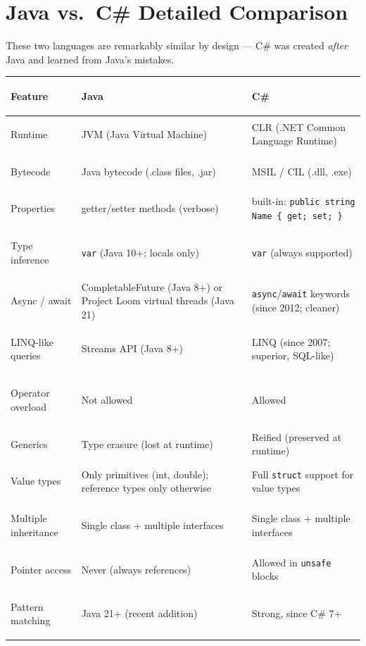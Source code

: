\documentclass[11pt, letterpaper]{article}
\begin{document}
\section*{Java vs.\ C\# Detailed Comparison}

These two languages are remarkably similar by design --- C\# was created \emph{after} Java and learned from Java's mistakes.

\noindent
{\small\renewcommand{\arraystretch}{1.6}
\begin{tabularx}{\textwidth}{>{\bfseries\raggedright\arraybackslash}p{3.2cm}
                              >{\raggedright\arraybackslash}X
                              >{\raggedright\arraybackslash}X}
\toprule
\rowcolor{tableheader}
\textbf{Feature} & \textbf{Java} & \textbf{C\#} \\
\midrule
\rowcolor{rowB}  Runtime         & JVM (Java Virtual Machine)         & CLR (.NET Common Language Runtime) \\
\rowcolor{rowA}  Bytecode        & Java bytecode (.class files, .jar) & MSIL / CIL (.dll, .exe) \\
\rowcolor{rowB}  Properties      & getter/setter methods (verbose)    & built-in: \texttt{public string Name \{ get; set; \}} \\
\rowcolor{rowA}  Type inference  & \texttt{var} (Java 10+; locals only) & \texttt{var} (always supported) \\
\rowcolor{rowB}  Async / await   & CompletableFuture (Java 8+) or Project Loom virtual threads (Java 21) & \texttt{async}/\texttt{await} keywords (since 2012; cleaner) \\
\rowcolor{rowA}  LINQ-like queries & Streams API (Java 8+)            & LINQ (since 2007; superior, SQL-like) \\
\rowcolor{rowB}  Operator overload & Not allowed                       & Allowed \\
\rowcolor{rowA}  Generics        & Type erasure (lost at runtime)     & Reified (preserved at runtime) \\
\rowcolor{rowB}  Value types     & Only primitives (int, double); reference types only otherwise & Full \texttt{struct} support for value types \\
\rowcolor{rowA}  Multiple inheritance & Single class + multiple interfaces & Single class + multiple interfaces \\
\rowcolor{rowB}  Pointer access  & Never (always references)          & Allowed in \texttt{unsafe} blocks \\
\rowcolor{rowA}  Pattern matching & Java 21+ (recent addition)        & Strong, since C\# 7+ \\

\end{tabularx}}
\end{document}
